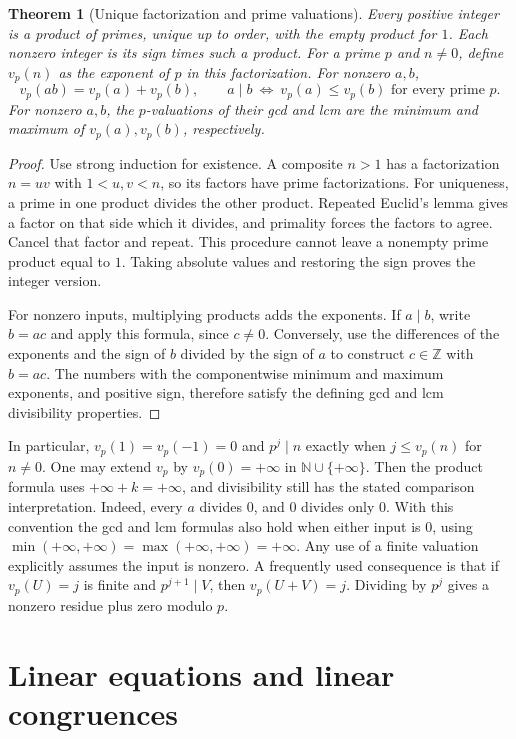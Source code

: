 \documentclass[11pt,oneside,openany]{book}
\theoremstyle{plain}
\newtheorem{theorem}{Theorem}[chapter]
\theoremstyle{definition}
\theoremstyle{remark}
\begin{document}
\begin{theorem}[Unique factorization and prime valuations]\label{nt:A02}
Every positive integer is a product of primes, unique up to order,
with the empty product for $1$. Each nonzero integer is its sign
times such a product. For a prime $p$ and $n\ne0$, define $v_p(n)$
as the exponent of $p$ in this factorization. For nonzero $a,b$,
\[
 v_p(ab)=v_p(a)+v_p(b),\qquad
 a\mid b\ \Longleftrightarrow\ v_p(a)\le v_p(b)
                       \text{ for every prime }p.
\]
For nonzero $a,b$, the $p$-valuations of their gcd and lcm are the
minimum and maximum of $v_p(a),v_p(b)$, respectively.
\end{theorem}
\begin{proof}
Use strong induction for existence. A composite $n>1$ has a
factorization $n=uv$ with $1<u,v<n$, so its factors have prime
factorizations. For uniqueness, a prime in one product divides
the other product. Repeated Euclid's lemma gives a factor on that
side which it divides, and primality forces the factors to agree.
Cancel that factor and repeat. This procedure cannot leave a
nonempty prime product equal to $1$. Taking absolute values and
restoring the sign proves the integer version.

For nonzero inputs, multiplying products adds the exponents. If
$a\mid b$, write $b=ac$ and apply this formula, since $c\ne0$.
Conversely, use the differences of the exponents and the sign of
$b$ divided by the sign of $a$ to construct $c\in\mathbb Z$ with
$b=ac$. The numbers with the componentwise minimum and maximum
exponents, and positive sign, therefore satisfy the defining gcd
and lcm divisibility properties.
\end{proof}

In particular, $v_p(1)=v_p(-1)=0$ and $p^j\mid n$ exactly when
$j\le v_p(n)$ for $n\ne0$. One may extend $v_p$ by $v_p(0)=+\infty$
in $\mathbb N\cup\{+\infty\}$. Then the product formula uses
$+\infty+k=+\infty$, and divisibility still has the stated
comparison interpretation. Indeed, every $a$ divides $0$, and
$0$ divides only $0$. With this convention the gcd and lcm
formulas also hold when either input is $0$, using
$\min(+\infty,+\infty)=\max(+\infty,+\infty)=+\infty$.
Any use of a finite valuation explicitly assumes the input is
nonzero. A frequently used consequence is that if $v_p(U)=j$
is finite and $p^{j+1}\mid V$, then $v_p(U+V)=j$. Dividing by
$p^j$ gives a nonzero residue plus zero modulo $p$.

\section{Linear equations and linear congruences}
\end{document}
